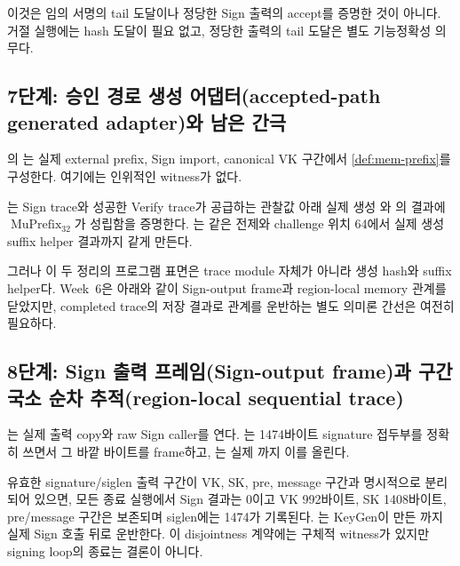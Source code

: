 이것은 임의 서명의 tail 도달이나 정당한 Sign 출력의 accept를 증명한 것이
아니다. 거절 실행에는 hash 도달이 필요 없고, 정당한 출력의 tail 도달은 별도
기능정확성 의무다.

\subsection{7단계: 승인 경로 생성 어댑터(accepted-path generated adapter)와 남은 간극}

의
는 실제 external prefix,
Sign import, canonical VK 구간에서 \cref{def:mem-prefix}를 구성한다. 여기에는
인위적인  witness가 없다.

\begin{verified}
\label{thm:accepted-api-adapter}
는 Sign trace와 성공한
Verify trace가 공급하는 관찰값 아래 실제 생성
와 의 결과에
\(\operatorname{MuPrefix}_{32}\)가 성립함을 증명한다.
는
같은 전제와 challenge 위치 64에서 실제 생성 suffix helper 결과까지 같게 만든다.
\end{verified}

그러나 이 두 정리의 프로그램 표면은 trace module 자체가 아니라 생성 hash와
suffix helper다. Week~6은 아래와 같이 Sign-output frame과 region-local memory
관계를 닫았지만, completed trace의 저장 결과로 관계를 운반하는 별도 의미론
간선은 여전히 필요하다.

\subsection{8단계: Sign 출력 프레임(Sign-output frame)과 구간 국소 순차 추적(region-local sequential trace)}

는 실제 출력 copy와 raw Sign caller를 연다.
는 1474바이트 signature
접두부를 정확히 쓰면서 그 바깥 바이트를 frame하고,
는 실제
까지 이를 올린다.

\begin{verified}
\label{thm:sign-output-frame}
유효한 signature/siglen 출력 구간이 VK, SK, pre, message 구간과 명시적으로
분리되어 있으면, 모든 종료 실행에서 Sign 결과는 0이고 VK 992바이트, SK
1408바이트, pre/message 구간은 보존되며 siglen에는 1474가 기록된다.
는 KeyGen이 만든
까지 실제 Sign 호출 뒤로 운반한다. 이
disjointness 계약에는 구체적 witness가 있지만 signing loop의 종료는 결론이
아니다.
\end{verified}


